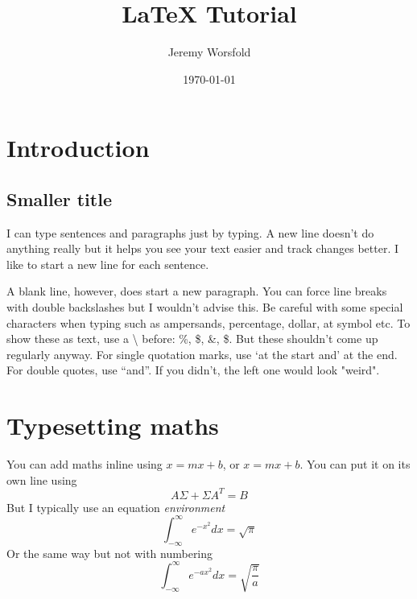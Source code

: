 \documentclass{article} %
\title{LaTeX Tutorial}
\author{Jeremy Worsfold}
\date{\today}
\begin{document}
\maketitle

\section{Introduction} %

\subsection{Smaller title} %

I can type sentences and paragraphs just by typing.
A new line doesn't do anything really but it helps you see your text easier and track changes better.
I like to start a new line for each sentence.

A blank line, however, does start a new paragraph. You can force line breaks with double backslashes but I wouldn't advise this. 
Be careful with some special characters when typing such as ampersands, percentage, dollar, at symbol etc. 
To show these as text, use a \textbackslash\; before: \%, \$, \&, \$. 
But these shouldn't come up regularly anyway.
For single quotation marks, use `at the start and' at the end. For double quotes, use ``and''. 
If you didn't, the left one would look "weird".



\section{Typesetting maths}

You can add maths inline using $x=mx + b$, or \(x=mx+b\). You can put it on its own line using 
\[
    A\Sigma + \Sigma A^T = B
\]
But I typically use an equation \textit{environment}
\begin{equation}
    \int_{-\infty}^\infty e^{-x^2} d x = \sqrt{\pi}
\end{equation}
Or the same way but not with numbering
\begin{equation*}
    \int_{-\infty}^\infty e^{-ax^2} d x = \sqrt{\frac{\pi}{a}}
\end{equation*}
\end{document}
